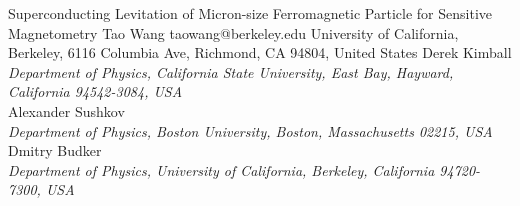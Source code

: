 \begin{conf-abstract}[]
{Superconducting Levitation of Micron-size Ferromagnetic Particle for Sensitive Magnetometry}
{\color{blue} Tao Wang}
{taowang@berkeley.edu}
{University of California, Berkeley, 6116 Columbia Ave, Richmond, CA 94804, United States}
{{\color{blue}Derek Kimball}\\ \textit{Department of Physics, California State University, East Bay, Hayward, California 94542-3084, USA}\\ 
{\color{blue}Alexander Sushkov}\\ \textit{ Department of Physics, Boston University, Boston, Massachusetts 02215, USA}\\ 
{\color{blue}Dmitry Budker}\\ \textit{Department of Physics, University of California, Berkeley, California 94720-7300, USA}\\ 
\decofourleft \decofourright}





\printbibliography[heading=none]

\end{conf-abstract}
